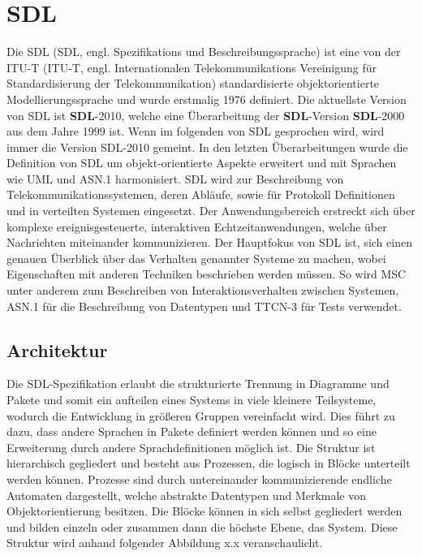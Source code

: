 \section{\acf{SDL}}
\label{sc:SDL}
Die \ac{SDL} (SDL, engl. Spezifikations und Beschreibungssprache) ist eine von der \ac{ITU-T} (ITU-T, engl. Internationalen 
Telekommunikations Vereinigung für Standardisierung der Telekommunikation) standardisierte objektorientierte Modellierungssprache und wurde erstmalig 
1976 definiert. Die aktuellste Version von \ac{SDL} ist \textbf{SDL}-2010, welche eine Überarbeitung der \textbf{SDL}-Version \textbf{SDL}-2000 aus dem Jahre 
1999 ist. Wenn im folgenden von \ac{SDL} gesprochen wird, wird immer die Version \acs{SDL}-2010 gemeint. In den letzten 
Überarbeitungen wurde die Definition von \ac{SDL} um objekt-orientierte Aspekte erweitert und mit Sprachen wie UML und ASN.1 
harmonisiert. \ac{SDL} wird zur Beschreibung von Telekommunikationssystemen, deren Abläufe, sowie für Protokoll Definitionen und in verteilten Systemen eingesetzt. Der Anwendungsbereich erstreckt sich über komplexe ereignisgesteuerte, interaktiven Echtzeitanwendungen, welche über Nachrichten miteinander kommunizieren. Der Hauptfokus von \ac{SDL} ist, sich einen genauen Überblick über das Verhalten genannter Systeme zu machen, wobei Eigenschaften mit anderen Techniken beschrieben werden müssen. So wird \ac{MSC} unter anderem zum Beschreiben von Interaktionsverhalten zwischen Systemen, \ac{ASN.1} für die Beschreibung von Datentypen und \ac{TTCN-3} für Tests verwendet.


\subsection{Architektur}
\label{ssc:Architektur}
Die \ac{SDL}-Spezifikation erlaubt die strukturierte Trennung in Diagramme und Pakete und somit ein aufteilen eines Systems in viele kleinere Teilsysteme, wodurch die Entwicklung in größeren Gruppen vereinfacht wird. Dies führt zu dazu, dass andere Sprachen in Pakete definiert werden können und so eine Erweiterung durch andere Sprachdefinitionen möglich ist. Die Struktur ist hierarchisch gegliedert und besteht aus Prozessen, die logisch in Blöcke unterteilt werden können. Prozesse sind durch untereinander kommunizierende endliche Automaten dargestellt, welche abstrakte Datentypen und Merkmale von Objektorientierung besitzen. Die Blöcke können in sich selbst gegliedert werden und bilden einzeln oder zusammen dann die höchste Ebene, das System. Diese Struktur wird anhand folgender Abbildung x.x veranschaulicht.

